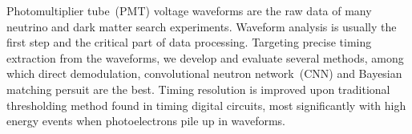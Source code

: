 Photomultiplier tube~(PMT) voltage waveforms are the raw data of many neutrino and dark matter search experiments.  Waveform analysis is usually the first step and the critical part of data processing.  Targeting precise timing extraction from the waveforms, we develop and evaluate several methods, among which direct demodulation, convolutional neutron network~(CNN) and Bayesian matching persuit are the best.  Timing resolution is improved upon traditional thresholding method found in timing digital circuits, most significantly with high energy events when photoelectrons pile up in waveforms.
